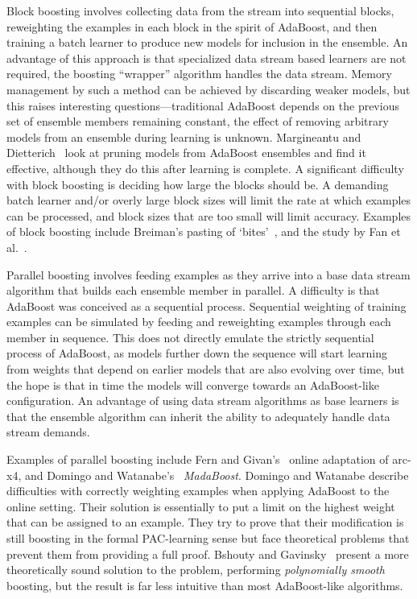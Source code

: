 Block boosting involves collecting data from the stream into sequential blocks,
reweighting the examples in each block in the spirit of AdaBoost, and then
training a batch learner to produce new models for inclusion in the
ensemble. An advantage of this approach is that specialized data stream
based learners are not required, the boosting ``wrapper'' algorithm
handles the data stream. Memory management by such a method can be
achieved by discarding weaker models, but this raises
interesting questions---traditional AdaBoost depends on the previous set
of ensemble members remaining constant, the effect of removing arbitrary
models from an ensemble during learning is unknown. Margineantu and Dietterich~\cite{pruneboost} look at pruning models from AdaBoost ensembles and find it effective, although they do this after learning is complete. A significant difficulty with block boosting is deciding how large the blocks should be. A demanding batch learner and/or overly large block sizes will limit the rate at which examples can be processed, and block sizes that are too small will limit accuracy.
Examples of block boosting include Breiman's pasting of `bites'~\cite{pastingbites}, and the study by Fan et al.~\cite{fszboost}.

Parallel boosting involves feeding examples as they arrive into a base data stream algorithm that builds each ensemble member in parallel. A difficulty is that AdaBoost was conceived as a sequential process. Sequential weighting of training examples can be simulated by feeding and reweighting examples through each member in sequence. This does not directly emulate the
strictly sequential process of AdaBoost, as models further down the
sequence will start learning from weights that depend on earlier models
that are also evolving over time, but the hope is that in time the
models will converge towards an AdaBoost-like configuration. An advantage
of using data stream algorithms as base learners is that the ensemble
algorithm can inherit the ability to adequately handle data stream demands.

Examples of parallel boosting include Fern and Givan's~\cite{branchpred} online adaptation of arc-x4, and Domingo and Watanabe's~\cite{madaboost} {\em MadaBoost}. Domingo and Watanabe describe difficulties with correctly weighting examples when applying AdaBoost to the online setting. Their solution is essentially to put a limit on the highest weight that can be assigned to an example. They try to prove that their modification is still boosting in the formal PAC-learning sense but face theoretical problems that prevent them from providing a full proof. Bshouty and Gavinsky~\cite{polyboost} present a more theoretically sound solution to the problem, performing {\em polynomially smooth} boosting, but the result is far less intuitive than most AdaBoost-like algorithms.

